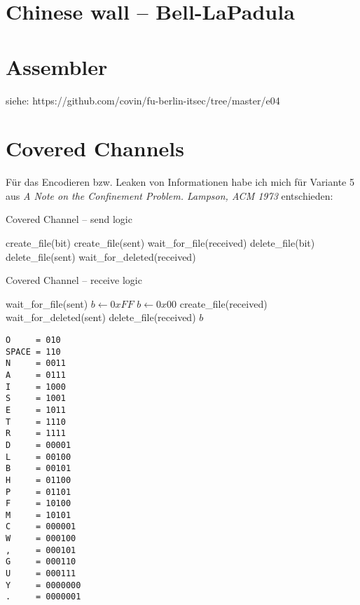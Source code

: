 




\newcommand{\nr}{04}


\section{Chinese wall -- Bell-LaPadula}
\section{Assembler}
siehe: https://github.com/covin/fu-berlin-itsec/tree/master/e04

\section{Covered Channels}
Für das Encodieren bzw. Leaken von Informationen habe ich mich für Variante 5
aus \textit{A Note on the Confinement Problem. Lampson, ACM 1973} entschieden:
\begin{algorithm}
\caption{Covered Channel -- send logic}
\begin{algorithmic}
         \State create\_file(bit)
    \EndIf
    \State create\_file(sent)
    \State wait\_for\_file(received)
         \State delete\_file(bit)
    \EndIf
    \State delete\_file(sent)
    \State wait\_for\_deleted(received)
    \State \Return
\EndFunction
\end{algorithmic}
\end{algorithm}

\begin{algorithm}
\caption{Covered Channel -- receive logic}
\begin{algorithmic}
    \State wait\_for\_file(sent)
         \State $b \gets 0xFF$
    \Else
         \State $b \gets 0x00$
    \EndIf
    \State create\_file(received)
    \State wait\_for\_deleted(sent)
    \State delete\_file(received)
    \State \Return $b$
\EndFunction
\end{algorithmic}
\end{algorithm}

\begin{lstlisting}
O     = 010
SPACE = 110
N     = 0011
A     = 0111
I     = 1000
S     = 1001
E     = 1011
T     = 1110
R     = 1111
D     = 00001
L     = 00100
B     = 00101
H     = 01100
P     = 01101
F     = 10100
M     = 10101
C     = 000001
W     = 000100
,     = 000101
G     = 000110
U     = 000111
Y     = 0000000
.     = 0000001
\end{lstlisting}


